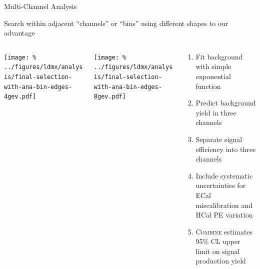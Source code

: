 \documentclass[aspectratio=169]{beamer}
\begin{document}
\begin{frame}{Multi-Channel Analysis}
  \begin{block}{}
    Search within adjacent ``channels'' or ``bins'' using different shapes to our advantage
  \end{block}
  \vfill
  \begin{columns}
    \begin{column}{0.35\textwidth}
      \texttt{[image: \%
        ../figures/ldmx/analysis/final-selection-with-ana-bin-edges-4gev.pdf]}
    \end{column}
    \begin{column}{0.35\textwidth}
      \texttt{[image: \%
        ../figures/ldmx/analysis/final-selection-with-ana-bin-edges-8gev.pdf]}
    \end{column}
    \begin{column}{0.3\textwidth}
      \footnotesize
      \begin{enumerate}
        \item Fit background with simple exponential function
        \item Predict background yield in three channels
        \item Separate signal efficiency into three channels
        \item Include systematic uncertainties for ECal miscalibration
          and HCal PE variation
        \item \textsc{Combine} estimates 95\% CL upper limit on signal
          production yield
      \end{enumerate}
    \end{column}
  \end{columns}
\end{frame}

\end{document}
